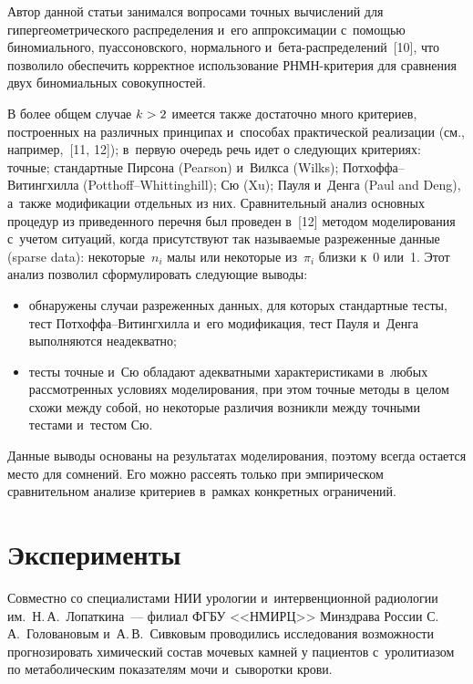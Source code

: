 \begin{multicols}{2}
Автор данной статьи занимался вопросами точных вычислений 
для гипергеометрического рас\-пределения и~его аппроксимации с~помощью\linebreak 
биномиального, пуассоновского, нормального  
и~бе\-та-рас\-пре\-де\-ле\-ний~[10], что позволило обес\-печить корректное 
использование РНМН-кри\-те\-рия для сравнения двух биномиальных 
со\-во\-куп\-ностей. 
{ %

}
     
     В более общем случае $k\hm>2$ имеется также достаточно много 
критериев, построенных на различных
 принципах и~способах практической 
реализации (см., например,~[11, 12]); в~первую очередь речь идет о следующих 
критериях: 
      точные; 
 стандартные Пирсона (Pearson) и~Вилкса (Wilks); 
 Потхоффа--Витингхилла (Potthoff--Whittinghill); 
 Сю (Xu); 
 Пауля и~Денга (Paul and Deng), 
а~также модификации отдельных из них. Сравнительный анализ 
основных процедур из приведенного перечня был проведен в~[12] 
методом моделирования с~учетом ситуаций, когда присутствуют так 
называемые разреженные данные (sparse data): некоторые~$n_i$ малы 
или некоторые из~$\pi_i$ близки к~0 или~1. Этот анализ позволил 
сформулировать следующие выводы:
\begin{itemize}
\item обнаружены случаи разреженных данных, для которых стандартные 
тесты, тест Пот\-хоф\-фа--Ви\-тинг\-хил\-ла и~его модификация, тест Пауля 
и~Денга выполняются неадекватно;
\item тесты точные и~Сю обладают адекватными характеристиками в~любых 
рассмотренных условиях моделирования, при этом точные методы в~целом 
схожи между собой, но некоторые различия возникли между точными 
тестами и~тес\-том Сю.
\end{itemize}

     Данные выводы основаны на результатах моделирования, поэтому всегда 
остается место для сомнений. Его можно рассеять только при эмпирическом 
сравнительном анализе критериев в~рамках конкретных ограничений.

\section{Эксперименты}

     Совместно со специалистами НИИ урологии и~интервенционной 
радиологии им.~Н.\,А.~Лопаткина~--- филиал ФГБУ <<НМИРЦ>> Минздрава 
России С.\,А.~Головановым и~А.\,В.~Сивковым проводились исследования 
возможности прогнозировать химический состав мочевых камней у пациентов 
с~уролитиазом по метаболическим показателям мочи и~сыворотки крови.


\end{multicols}
